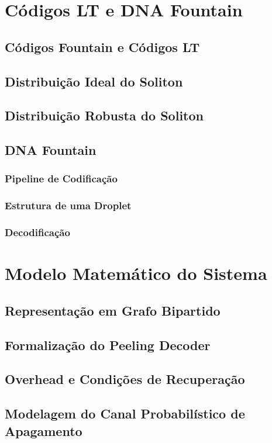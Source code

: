 \chapter{Códigos LT e DNA Fountain}

\section{Códigos Fountain e Códigos LT}
\section{Distribuição Ideal do Soliton}
\section{Distribuição Robusta do Soliton}
\section{DNA Fountain}
\subsection{Pipeline de Codificação}
\subsection{Estrutura de uma Droplet}
\subsection{Decodificação}

\chapter{Modelo Matemático do Sistema}

\section{Representação em Grafo Bipartido}
\section{Formalização do Peeling Decoder}
\section{Overhead e Condições de Recuperação}
\section{Modelagem do Canal Probabilístico de Apagamento}
